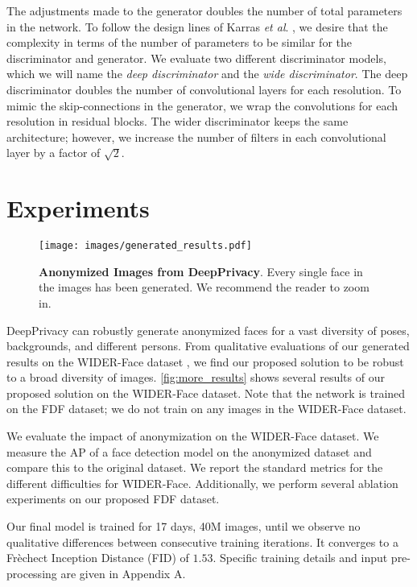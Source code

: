 \documentclass[runningheads]{llncs}
\newcommand{\etal}{\textit{et al}. }
\begin{document}
The adjustments made to the generator doubles the number of total parameters in the network. To follow the design lines of Karras \etal \cite{Karras2017}, we desire that the complexity in terms of the number of parameters to be similar for the discriminator and generator. We evaluate two different discriminator models, which we will name the \textit{deep discriminator} and the \textit{wide discriminator}. The deep discriminator doubles the number of convolutional layers for each resolution. To mimic the skip-connections in the generator, we wrap the convolutions for each resolution in residual blocks.
The wider discriminator keeps the same architecture; however, we increase the number of filters in each convolutional layer by a factor of $\sqrt{2}$. %
 \section{Experiments}

\begin{figure}
    \centering
    \texttt{[image: images/generated\_results.pdf]}
    \caption{\textbf{Anonymized Images from DeepPrivacy}. Every single face in the images has been generated. We recommend the reader to zoom in.}
    \label{fig:more_results}
\end{figure}

DeepPrivacy can robustly generate anonymized faces for a vast diversity of poses, backgrounds, and different persons.
From qualitative evaluations of our generated results on  the WIDER-Face dataset \cite{yang2016wider}, we find our proposed solution to  be robust to a broad diversity of images.
\autoref{fig:more_results} shows several results of our proposed solution on the WIDER-Face dataset. Note that the network is trained on the FDF dataset; we do not train on any images in the WIDER-Face dataset.


We evaluate the impact of anonymization on the WIDER-Face \cite{yang2016wider} dataset.
We measure the AP of a face detection model on the anonymized dataset and compare this to the original dataset.
We report the standard metrics for the different difficulties for WIDER-Face. Additionally, we perform several ablation experiments on our proposed FDF dataset.

Our final model is trained for 17 days, 40M images, until we observe no qualitative differences between consecutive training iterations. It converges to a Fr\`echect Inception Distance (FID) \cite{heusel2017gans} of $1.53$. Specific training details and input pre-processing  are given in Appendix A.
\end{document}
